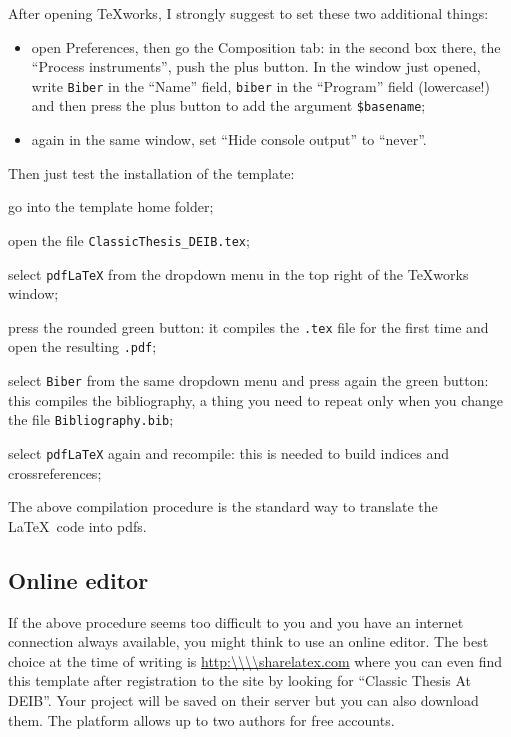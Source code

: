 After opening TeXworks, I strongly suggest to set these two additional things:
\begin{itemize}
	\item open Preferences, then go the Composition tab: in the second box there, the \enquote{Process instruments}, push the plus button.
	In the window just opened, write \verb!Biber! in the \enquote{Name} field, \verb!biber! in the \enquote{Program} field (lowercase!) and then press the plus button to add the argument \verb!$basename!;
	\item again in the same window, set \enquote{Hide console output} to \enquote{never}.
\end{itemize}

Then just test the installation of the template:
\begin{aenumerate}
	\item go into the template home folder;
	\item open the file \verb!ClassicThesis_DEIB.tex!;
	\item select \verb!pdfLaTeX! from the dropdown menu in the top right of the TeXworks window;
	\item press the rounded green button: it compiles the \verb!.tex! file for the first time and open the resulting \verb!.pdf!;
	\item select \verb!Biber! from the same dropdown menu and press again the green button: this compiles the bibliography, a thing you need to repeat only when you change the file \verb!Bibliography.bib!;
	\item select \verb!pdfLaTeX! again and recompile: this is needed to build indices and crossreferences;
\end{aenumerate}
The above compilation procedure is the standard way to translate the \LaTeX\ code into pdfs.

\subsection{Online editor}
If the above procedure seems too difficult to you and you have an internet connection always available, you might think to use an online editor.
The best choice at the time of writing is \url{http:\\\\sharelatex.com} where you can even find this template after registration to the site by looking for \enquote{Classic Thesis At DEIB}.
Your project will be saved on their server but you can also download them.
The platform allows up to two authors for free accounts.

